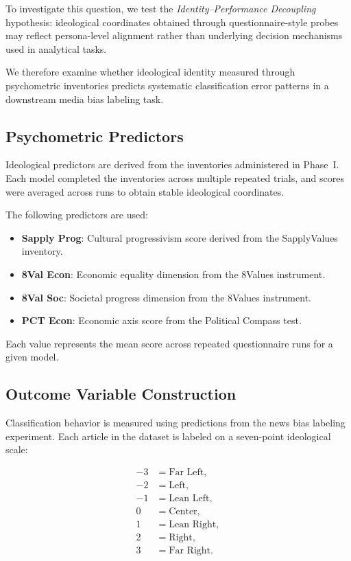 \documentclass[11pt]{article}
\begin{document}
To investigate this question, we test the \textit{Identity--Performance Decoupling} hypothesis: ideological coordinates obtained through questionnaire-style probes may reflect persona-level alignment rather than underlying decision mechanisms used in analytical tasks.

We therefore examine whether ideological identity measured through psychometric inventories predicts systematic classification error patterns in a downstream media bias labeling task.

\subsection{Psychometric Predictors}

Ideological predictors are derived from the inventories administered in Phase~I. Each model completed the inventories across multiple repeated trials, and scores were averaged across runs to obtain stable ideological coordinates.

The following predictors are used:

\begin{itemize}
\item \textbf{Sapply Prog}: Cultural progressivism score derived from the SapplyValues inventory.
\item \textbf{8Val Econ}: Economic equality dimension from the 8Values instrument.
\item \textbf{8Val Soc}: Societal progress dimension from the 8Values instrument.
\item \textbf{PCT Econ}: Economic axis score from the Political Compass test.
\end{itemize}

Each value represents the mean score across repeated questionnaire runs for a given model.

\subsection{Outcome Variable Construction}

Classification behavior is measured using predictions from the news bias labeling experiment. Each article in the dataset is labeled on a seven-point ideological scale:

\begin{align*}
-3 &= \text{Far Left}, \\
-2 &= \text{Left}, \\
-1 &= \text{Lean Left}, \\
 0 &= \text{Center}, \\
 1 &= \text{Lean Right}, \\
 2 &= \text{Right}, \\
 3 &= \text{Far Right}.
\end{align*}
\end{document}
